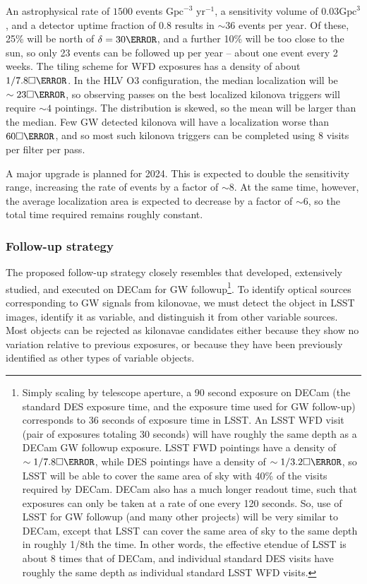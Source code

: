 An astrophysical rate of $1500$ events $\mbox{Gpc}^{-3}$ $\mbox{yr}^{-1}$, a sensitivity volume of $0.03 \mbox{Gpc}^3$, and a detector uptime fraction of $0.8$ results in $\sim 36$ events per year. Of these, 25\% will be north of $\delta=30\degree$, and a further 10\% will be too close to the sun, so only 23 events can be followed up per year -- about one event every 2 weeks. The tiling scheme for WFD exposures has a density of about $1/7.8\square\degree$. In the HLV O3 configuration, the median localization will be $\sim 23 \square\degree$, so observing passes on the best localized kilonova triggers will require $\sim 4$ pointings. The distribution is skewed, so the mean will be larger than the median. Few GW detected kilonova will have a localization worse than $60 \square \degree$, and so most such kilonova triggers can be completed using 8 visits per filter per pass.

A major upgrade is planned for 2024. This is expected to double the sensitivity range, increasing the rate of events by a factor of $\sim8$. At the same time, however, the average localization area is expected to decrease by a factor of $\sim6$, so the total time required remains roughly constant.


\subsubsection{Follow-up strategy}

The proposed follow-up strategy closely resembles that developed, extensively studied, and executed on DECam for GW followup\footnote{Simply scaling by telescope aperture, a 90 second exposure on DECam (the standard DES exposure time, and the exposure time used for GW follow-up) corresponds to 36 seconds of exposure time in LSST. An LSST WFD visit (pair of exposures totaling 30 seconds) will have roughly the same depth as a DECam GW followup exposure. LSST FWD pointings have a density of $\sim 1/7.8\square\degree$, while DES pointings have a density of $\sim 1/3.2\square\degree$, so LSST will be able to cover the same area of sky with 40\% of the visits required by DECam.  DECam also has a much longer readout time, such that exposures can only be taken at a rate of one every 120 seconds. So, use of LSST for GW followup (and many other projects) will be very similar to DECam, except that LSST can cover the same area of sky to the same depth in roughly 1/8th the time. In other words, the effective etendue of LSST is about 8 times that of DECam, and individual standard DES visits have roughly the same depth as individual standard LSST WFD visits.}\citep{decamfollowupdetails, 2017ApJ...848L..16S, 2016ApJ...826L..29C, 2016ApJ...823L..33S}. To identify optical sources corresponding to GW signals from kilonovae, we must detect the object in LSST images, identify it as variable, and distinguish it from other variable sources. Most objects can be rejected as kilonavae candidates either because they show no variation relative to previous exposures, or because they have been previously identified as other types of variable objects.

